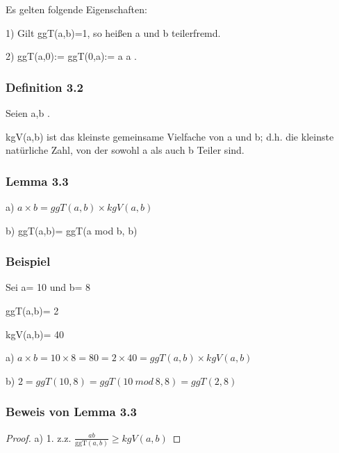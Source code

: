 \documentclass[12pt]{article}
\begin{document}
\begin{algorithm}
\vspace{0.3cm}

Es gelten folgende Eigenschaften:

\vspace{0.2cm}

1) Gilt ggT(a,b)=1, so heißen a und b teilerfremd.

\vspace{0.15cm}

2) ggT(a,0):= ggT(0,a):= a  \forall a \in {}.




\vspace{1cm}
\subsubsection*{Definition 3.2}
Seien a,b \in {}.

\noindent kgV(a,b) ist das kleinste gemeinsame Vielfache von a und b; d.h. die kleinste natürliche Zahl, von der sowohl a als auch b Teiler sind. 

\vspace{1cm}
\subsubsection*{Lemma 3.3}
a) $a\times b = ggT(a,b) \times kgV(a,b)$


\noindent b) ggT(a,b)= ggT(a mod b, b)

\vspace{1cm}
\subsubsection*{Beispiel}
Sei a= 10 und b= 8

ggT(a,b)= 2

kgV(a,b)= 40

\vspace{0,5cm}

a) $a \times b= 10 \times 8= 80= 2\times 40 = ggT(a,b) \times kgV(a,b)$

b) $2= ggT(10,8) = ggT (10 \ mod \ 8,8) = ggT(2,8)$

\vspace{1cm}
\subsubsection*{Beweis von Lemma 3.3}

\begin{proof}

a) 1. z.z. $\frac{ab}{\text{ggT}(a,b)} \geq  kgV (a,b) $


\end{proof}
\end{algorithm}
\end{document}
